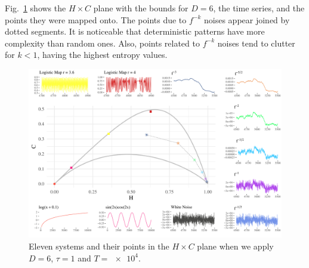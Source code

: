 Fig.~\ref{fig:AllSystems} shows the $H\times C$ plane with the bounds for $D=6$, the time series, and the points they were mapped onto.
The points due to $f^{-k}$ noises appear joined by dotted segments.
It is noticeable that deterministic patterns have more complexity than random ones.
Also, points related to $f^{-k}$ noises tend to clutter for $k<1$, having the highest entropy values.

\begin{figure}
    \centering
    \includegraphics[width=\linewidth]{Figures/AllSystems.pdf}
    \caption{Eleven systems and their points in the $H\times C$ plane when we apply $D = 6$, $\tau = 1$ and $T = \num[scientific-notation=true]{e4}$.}
    \label{fig:AllSystems}
\end{figure}

	

